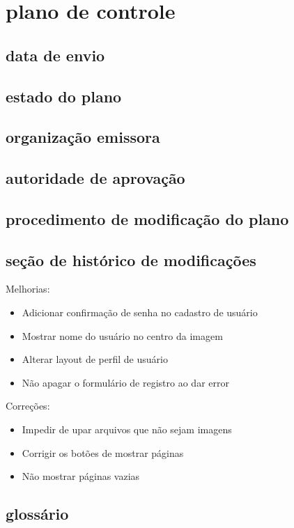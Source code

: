 \chapter{plano de controle}

\section{data de envio}

\section{estado do plano}

\section{organização emissora}

\section{autoridade de aprovação}

\section{procedimento de modificação do plano}

\section{seção de histórico de modificações}

Melhorias:

 \begin{itemize}
   \item Adicionar confirmação de senha no cadastro de usuário
   \item Mostrar nome do usuário no centro da imagem
   \item Alterar layout de perfil de usuário
   \item Não apagar o formulário de registro ao dar error
 \end{itemize}

Correções:

 \begin{itemize}
   \item Impedir de upar arquivos que não sejam imagens
   \item Corrigir os botões de mostrar páginas
   \item Não mostrar páginas vazias
 \end{itemize}

\section{glossário}
